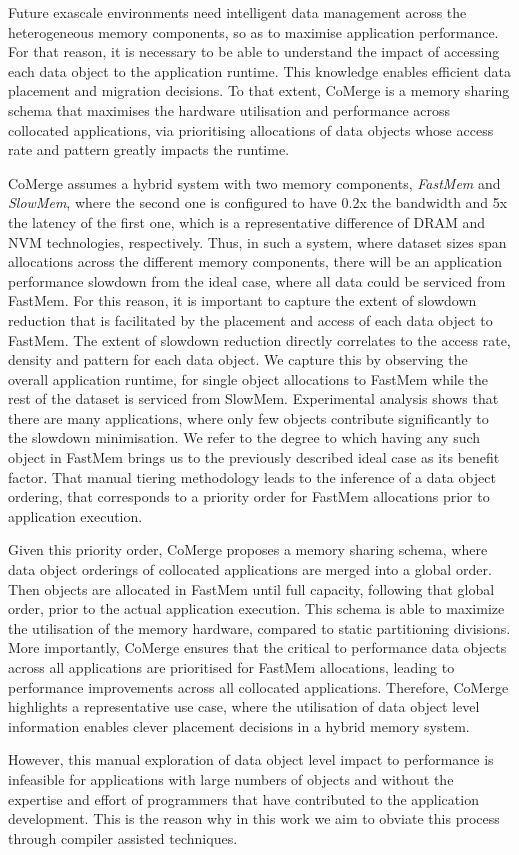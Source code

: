 Future exascale environments need intelligent data management across the heterogeneous memory components, so as to maximise application performance.
For that reason, it is necessary to be able to understand the impact of accessing each data object to the application runtime.
This knowledge enables efficient data placement and migration decisions.
To that extent, CoMerge \cite{Doudali:2017:CTE:3132402.3132418} is a memory sharing schema that maximises the hardware utilisation and performance across collocated applications, via prioritising allocations of data objects whose access rate and pattern greatly impacts the runtime.
 
CoMerge assumes a hybrid system with two memory components, \textit{FastMem} and \textit{SlowMem}, where the second one is configured to have 0.2x the bandwidth and 5x the latency of the first one, which is a representative difference of DRAM and \ac{NVM} technologies, respectively.
Thus, in such a system, where dataset sizes span allocations across the different memory components, there will be an application performance slowdown from the ideal case, where all data could be serviced from FastMem.
For this reason, it is important to capture the extent of slowdown reduction that is facilitated by the placement and access of each data object to FastMem.
The extent of slowdown reduction directly correlates to the access rate, density and pattern for each data object.
We capture this by observing the overall application runtime, for single object allocations to FastMem while the rest of the dataset is serviced from SlowMem.
Experimental analysis shows that there are many applications, where only few objects contribute significantly to the slowdown minimisation.
We refer to the degree to which having any such object in FastMem brings us to the previously described ideal case as its benefit factor.
That manual tiering methodology leads to the inference of a data object ordering, that corresponds to a priority order for FastMem allocations prior to application execution.

Given this priority order, CoMerge proposes a memory sharing schema, where data object orderings of collocated applications are merged into a global order.
Then objects are allocated in FastMem until full capacity, following that global order, prior to the actual application execution.
This schema is able to maximize the utilisation of the memory hardware, compared to static partitioning divisions.
More importantly, CoMerge ensures that the critical to performance data objects across all applications are prioritised for FastMem allocations, leading to performance improvements across all collocated applications.
Therefore, CoMerge highlights a representative use case, where the utilisation of data object level information enables clever placement decisions in a hybrid memory system.

However, this manual exploration of data object level impact to performance is infeasible for applications with large numbers of objects and without the expertise and effort of programmers that have contributed to the application development.
This is the reason why in this work we aim to obviate this process through compiler assisted techniques.
